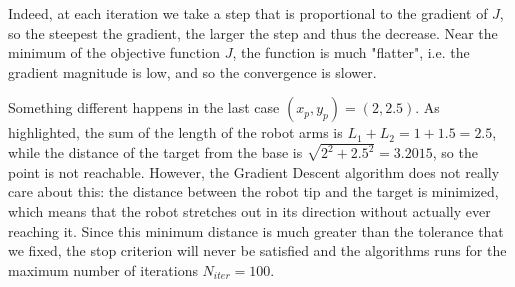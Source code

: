 \documentclass{article}
\begin{document}
Indeed, at each iteration we take a step that is proportional to the gradient of $J$, so the steepest the gradient, the larger the step and thus the decrease. Near the minimum of the objective function $J$, the function is much "flatter", i.e. the gradient magnitude is low, and so the convergence is slower.

Something different happens in the last case $(x_p,y_p)=(2, 2.5)$. As highlighted, the sum of the length of the robot arms is $L_1 + L_2 = 1 + 1.5 = 2.5$, while the distance of the target from the base is $\sqrt{2^2+2.5^2}=3.2015$, so the point is not reachable. However, the Gradient Descent algorithm  does not really care about this: the distance between the robot tip and the target is minimized, which means that the robot stretches out in its direction without actually ever reaching it. Since this minimum distance is much greater than the tolerance that we fixed, the stop criterion will never be satisfied and the algorithms runs for the maximum number of iterations $N_{iter}=100$.
\end{document}
